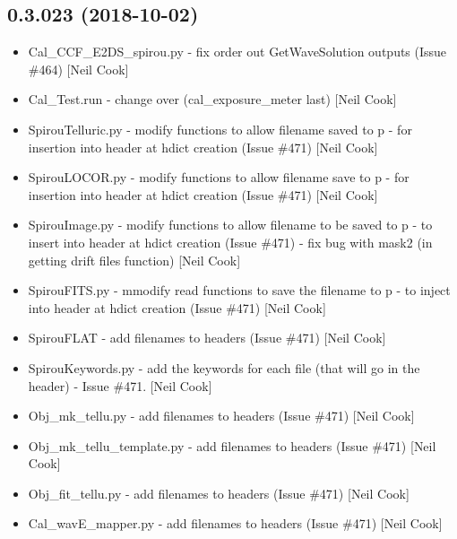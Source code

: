 \documentclass[a4paper,10pt,english]{report}
\begin{document}
\subsection{0.3.023 (2018-10-02)}
\label{\detokenize{misc/changelog:id307}}\begin{itemize}
\item {} 
Cal\_CCF\_E2DS\_spirou.py - fix order out GetWaveSolution outputs (Issue
\#464) {[}Neil Cook{]}

\item {} 
Cal\_Test.run - change over (cal\_exposure\_meter last) {[}Neil Cook{]}

\item {} 
SpirouTelluric.py - modify functions to allow filename saved to p -
for insertion into header at hdict creation (Issue  \#471) {[}Neil Cook{]}

\item {} 
SpirouLOCOR.py - modify functions to allow filename save to p - for
insertion into header at hdict creation (Issue  \#471) {[}Neil Cook{]}

\item {} 
SpirouImage.py - modify functions to allow filename to be saved to p -
to insert into header at hdict creation (Issue  \#471) - fix bug with
mask2 (in getting drift files function) {[}Neil Cook{]}

\item {} 
SpirouFITS.py - mmodify read functions to save the filename to p - to
inject into header at hdict creation (Issue  \#471) {[}Neil Cook{]}

\item {} 
SpirouFLAT - add filenames to headers (Issue  \#471) {[}Neil Cook{]}

\item {} 
SpirouKeywords.py - add the keywords for each file (that will go in
the header) - Issue  \#471. {[}Neil Cook{]}

\item {} 
Obj\_mk\_tellu.py - add filenames to headers (Issue  \#471) {[}Neil Cook{]}

\item {} 
Obj\_mk\_tellu\_template.py - add filenames to headers (Issue  \#471)
{[}Neil Cook{]}

\item {} 
Obj\_fit\_tellu.py - add filenames to headers (Issue  \#471) {[}Neil Cook{]}

\item {} 
Cal\_wavE\_mapper.py - add filenames to headers (Issue  \#471) {[}Neil
Cook{]}


\end{itemize}
\end{document}
